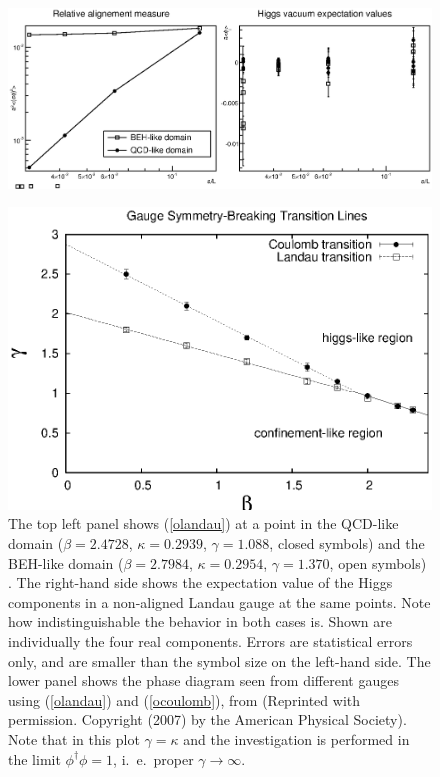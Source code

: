 \documentclass[final,12pt,3p,longtitle]{elsarticle}
\newcommand*{\pref}[1]{(\ref{#1})}
\newcommand*{\1}{1\!\!\!\bot}
\begin{document}
\begin{figure}[!htbp]
\includegraphics[width=\linewidth]{global}\\
\begin{center}
\includegraphics[width=0.8\linewidth]{gc-pd}
\end{center}
\caption{\label{fig:cg}The top left panel shows \pref{olandau} at a point in the QCD-like domain ($\beta=2.4728$, $\kappa=0.2939$, $\gamma=1.088$, closed symbols) and the BEH-like domain ($\beta=2.7984$, $\kappa=0.2954$, $\gamma=1.370$, open symbols) \cite{Maas:unpublished}. The right-hand side shows the expectation value of the Higgs components in a non-aligned Landau gauge \cite{Maas:2012ct,Maas:unpublished} at the same points. Note how indistinguishable the behavior in both cases is. Shown are individually the four real components. Errors are statistical errors only, and are smaller than the symbol size on the left-hand side. The lower panel shows the phase diagram seen from different gauges using \pref{olandau} and \pref{ocoulomb}, from \cite{Caudy:2007sf} (Reprinted with permission. Copyright (2007) by the American Physical Society). Note that in this plot $\gamma=\kappa$ and the investigation is performed in the limit $\phi^\dagger\phi=1$, i.\ e.\ proper $\gamma\to\infty$.}
\end{figure}
\end{document}
